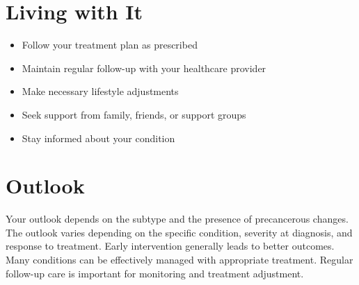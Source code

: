 \section{Living with It}
\begin{itemize}[noitemsep]
  \item Follow your treatment plan as prescribed
  \item Maintain regular follow-up with your healthcare provider
  \item Make necessary lifestyle adjustments
  \item Seek support from family, friends, or support groups
  \item Stay informed about your condition
\end{itemize}
\section{Outlook}
Your outlook depends on the subtype and the presence of precancerous changes. The outlook varies depending on the specific condition, severity at diagnosis, and response to treatment. Early intervention generally leads to better outcomes. Many conditions can be effectively managed with appropriate treatment. Regular follow-up care is important for monitoring and treatment adjustment.
